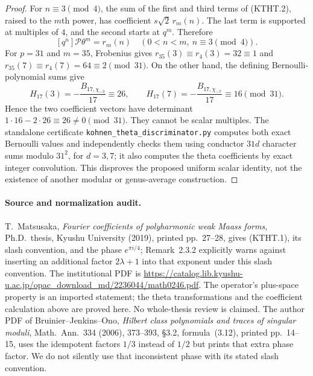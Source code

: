 \begin{proof}
For $n\equiv3\pmod4$, the sum of the first and third
terms of (KTHT.2), raised to the $m$th power, has coefficient
$s\sqrt2\,r_m(n)$.  The last term is supported at multiples
of $4$, and the second starts at $q^m$.  Therefore
\[
 [q^n]\mathcal P\theta^m=r_m(n)
 \quad(0<n<m,\ n\equiv3\pmod4).                        \tag{KTHT.3}
\]
For $p=31$ and $m=35$, Frobenius gives
$r_{35}(3)\equiv r_4(3)=32\equiv1$ and
$r_{35}(7)\equiv r_4(7)=64\equiv2\pmod{31}$.
On the other hand, the defining Bernoulli-polynomial sums give
\[
 H_{17}(3)=-\frac{B_{17,\chi_{-3}}}{17}\equiv26,
 \qquad
 H_{17}(7)=-\frac{B_{17,\chi_{-7}}}{17}\equiv16
 \pmod{31}.
\]
Hence the two coefficient vectors have determinant
$1\cdot16-2\cdot26\equiv26\ne0\pmod{31}$.
They cannot be scalar multiples.  The standalone certificate
\texttt{kohnen\_theta\_discriminator.py} computes both exact
Bernoulli values and independently checks them using conductor
$31d$ character sums modulo $31^2$, for $d=3,7$; it also
computes the theta coefficients by exact integer convolution.
This disproves the proposed uniform scalar identity, not the
existence of another modular or genus-average construction.
\end{proof}

\paragraph{Source and normalization audit.}
T.~Matsusaka, \emph{Fourier coefficients of polyharmonic weak
Maass forms}, Ph.D.~thesis, Kyushu University (2019), printed
pp.~27--28, gives (KTHT.1), its slash convention, and the
phase $e^{\pi i/4}$; Remark~2.3.2 explicitly warns against
inserting an additional factor $2\lambda+1$ into that exponent
under this slash convention.  The institutional PDF is
\url{https://catalog.lib.kyushu-u.ac.jp/opac_download_md/2236044/math0246.pdf}.
The operator's plus-space property is an imported statement;
the theta transformations and the coefficient calculation above
are proved here.  No whole-thesis review is claimed.
The author PDF of Bruinier--Jenkins--Ono,
\emph{Hilbert class polynomials and traces of singular moduli},
Math.~Ann.~334 (2006), 373--393, \S3.2, formula~(3.12),
printed pp.~14--15, uses the idempotent factors $1/3$ instead of
$1/2$ but prints that extra phase factor.  We do not silently
use that inconsistent phase with its stated slash convention.
